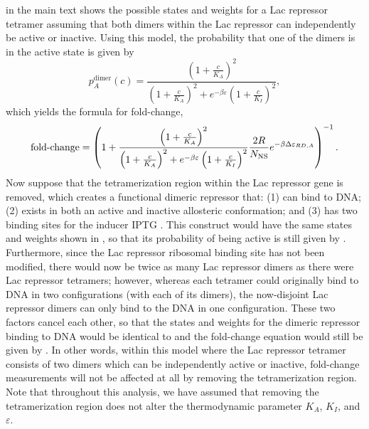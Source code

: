 \fref[figrepressorInducerStates] in the main text shows the possible states and
weights for a Lac repressor tetramer assuming that both dimers within the Lac
repressor can independently be active or inactive. Using this model, the
probability that one of the dimers is in the active state is given by
\begin{equation}\label{AppendixEq1}
p_A^{\text{dimer}}(c)=\frac{\left(1+\frac{c}{K_A}\right)^2}{\left(1+\frac{c}{K_A}\right)^2+e^{-\beta  \varepsilon }\left(1+\frac{c}{K_I}\right)^2},
\end{equation}
which yields the formula for fold-change,
\begin{equation}\label{AppendixEq2}
\operatorname{fold-change}= \left(
1+\frac{\left(1+\frac{c}{K_A}\right)^2}{\left(1+\frac{c}{K_A}\right)^2+e^{-\beta  \varepsilon }\left(1+\frac{c}{K_I}\right)^2}\frac{2 R}{N_{\text{NS}}}e^{-\beta \Delta\varepsilon_{RD,A}} \right)^{-1}.
\end{equation}
Now suppose that the tetramerization region within the Lac repressor gene is
removed, which creates a functional dimeric repressor that: (1) can bind to DNA;
(2) exists in both an active and inactive allosteric conformation; and (3) has
two binding sites for the inducer IPTG \cite{Daber2011a, Daber2009}. This
construct would have the same states and weights shown in
\fref[figrepressorInducerStates], so that its probability of being active is
still given by \eref[AppendixEq1]. Furthermore, since the Lac repressor
ribosomal binding site has not been modified, there would now be twice as many
Lac repressor dimers as there were Lac repressor tetramers; however, whereas
each tetramer could originally bind to DNA in two configurations (with each of
its dimers), the now-disjoint Lac repressor dimers can only bind to the DNA in
one configuration. These two factors cancel each other, so that the states and
weights for the dimeric repressor binding to DNA would be identical to
\fref[figpolymeraseRepressorStates] and the fold-change equation would still be
given by \eref[AppendixEq2]. In other words, within this model where the Lac
repressor tetramer consists of two dimers which can be independently active or
inactive, fold-change measurements will not be affected at all by removing the
tetramerization region. Note that throughout this analysis, we have assumed that
removing the tetramerization region does not alter the thermodynamic parameter
$K_A$, $K_I$, and $\varepsilon$.

